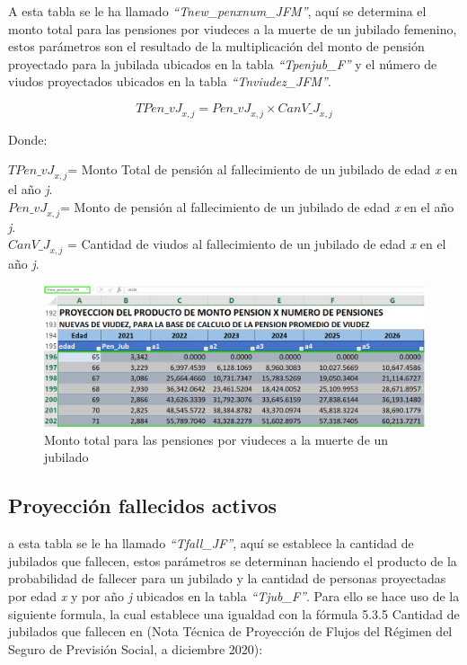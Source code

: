 \documentclass[
  letterpaper,
  DIV=11,
  numbers=noendperiod]{scrreprt}
\begin{document}
A esta tabla se le ha llamado \emph{``Tnew\_penxnum\_JFM''}, aquí se
determina el monto total para las pensiones por viudeces a la muerte de
un jubilado femenino, estos parámetros son el resultado de la
multiplicación del monto de pensión proyectado para la jubilada ubicados
en la tabla \emph{``Tpenjub\_F''} y el número de viudos proyectados
ubicados en la tabla \emph{``Tnviudez\_JFM''}.

\begin{equation}
{TPen\_vJ}_{x,j}={Pen\_vJ}_{x,j}\times{CanV\_J}_{x,j}
\end{equation}

Donde:

\({TPen\_vJ}_{x,j}\)= Monto Total de pensión al fallecimiento de un
jubilado de edad \emph{x} en el año \emph{j}.\\
\({Pen\_vJ}_{x,j}\)= Monto de pensión al fallecimiento de un jubilado de
edad \emph{x} en el año \emph{j}.\\
\(Can{V\_J}_{x,j}\) = Cantidad de viudos al fallecimiento de un jubilado
de edad \emph{x} en el año \emph{j}.

\begin{figure}

{\centering \includegraphics{images/F/Img31.png}

}

\caption{Monto total para las pensiones por viudeces a la muerte de un
jubilado}

\end{figure}

\hypertarget{proyecciuxf3n-fallecidos-activos}{%
\subsection{Proyección fallecidos
activos}\label{proyecciuxf3n-fallecidos-activos}}

a esta tabla se le ha llamado \emph{``Tfall\_JF''}, aquí se establece la
cantidad de jubilados que fallecen, estos parámetros se determinan
haciendo el producto de la probabilidad de fallecer para un jubilado y
la cantidad de personas proyectadas por edad \emph{x} y por año \emph{j}
ubicados en la tabla \emph{``Tjub\_F''}. Para ello se hace uso de la
siguiente formula, la cual establece una igualdad con la fórmula 5.3.5
Cantidad de jubilados que fallecen en (Nota Técnica de Proyección de
Flujos del Régimen del Seguro de Previsión Social, a diciembre 2020):
\end{document}
